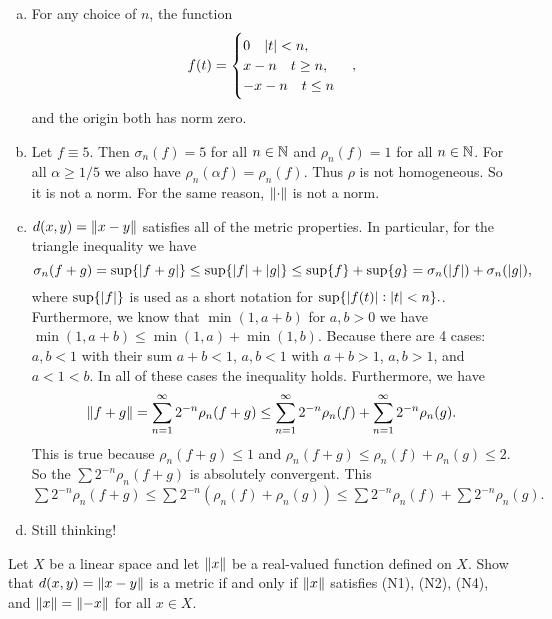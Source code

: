 \begin{solution}
	\begin{enumerate}[(a)]
		\item For any choice of $ n $, the function
		\[ f(t) = \begin{cases}
			0 \quad |t|<n,\\
			x-n \quad t\geq n,\\
			-x-n \quad t\leq n
		\end{cases}, \]
		and the origin both has norm zero.
		
		\item Let $ f \equiv 5 $. Then $ \sigma_n(f) = 5 $ for all $ n\in\mathbb{N} $ and $ \rho_n(f) = 1 $ for all $ n\in \mathbb{N} $. For all $ \alpha \geq 1/5 $ we also have $ \rho_n(\alpha f) = \rho_n(f) $. Thus $ \rho $ is not homogeneous. So it is not a norm. For the same reason, $ \norm{\cdot} $ is not a norm.
		
		\item $ d(x,y) = \norm{x-y} $ satisfies all of the metric properties. In particular, for the triangle inequality we have
		\[ \sigma_n(f+g) = \sup\{|f+g|\} \leq \sup\{|f|+|g|\}\leq \sup\{f\} + \sup\{g\} = \sigma_n(|f|) + \sigma_n(|g|), \]
		where $ \sup\{|f|\} $ is used as a short notation for $ \sup\{|f(t)|:|t|<n\}. $. Furthermore, we know that $ \min(1,a+b) $ for $ a,b>0 $ we have $ \min(1,a+b) \leq \min(1,a) + \min(1,b)  $. Because there are 4 cases: $ a,b<1 $ with their sum $ a+b<1 $, $ a,b<1 $ with $ a+b> 1 $, $ a,b>1 $, and $ a<1<b $. In all of these cases the inequality holds. Furthermore, we have
		\[ \norm{f+g}  = \sum_{n=1}^{\infty} 2^{-n}\rho_n(f+g) \leq \sum_{n=1}^{\infty}2^{-n}\rho_n(f) + \sum_{n=1}^{\infty}2^{-n}\rho_n(g).  \]
		This is true because $ \rho_n(f+g)\leq 1 $ and $ \rho_n(f+g) \leq \rho_n(f) + \rho_n(g) \leq 2 $. So the $ \sum 2^{-n}\rho_n(f+g) $ is absolutely convergent. This $ \sum 2^{-n}\rho_n(f+g) \leq \sum 2^{-n}(\rho_n(f) + \rho_n(g)) \leq \sum 2^{-n}\rho_n(f) + \sum 2^{-n}\rho_n(g).  $
		
		
		\item Still thinking!
	\end{enumerate}
\end{solution}



\begin{problem}
	\label{prob:allMetricsOnLinearSpace}
	Let $ X $ be a linear space and let $ \norm{x} $ be a real-valued function defined on $ X $. Show that $ d(x,y) = \norm{x-y} $ is a metric if and only if $ \norm{x} $ satisfies (N1), (N2), (N4), and $ \norm{x} = \norm{-x} $ for all $ x\in X $.
\end{problem}

